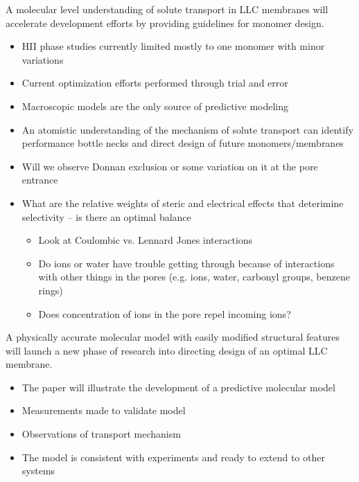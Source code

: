 \documentclass{article}
\begin{document}
	A molecular level understanding of solute transport in LLC membranes will accelerate development efforts by providing guidelines for monomer design.
	\begin{itemize}
		\item HII phase studies currently limited mostly to one monomer with minor variations
		\item Current optimization efforts performed through trial and error
		\item Macroscopic models are the only source of predictive modeling
		\item An atomistic understanding of the mechanism of solute transport can identify
		performance bottle necks and direct design of future monomers/membranes
		\item Will we observe Donnan exclusion or some variation on it at the pore entrance
		\item What are the relative weights of steric and electrical effects that deterimine selectivity -- is there an optimal balance
		\begin{itemize}
			\item Look at Coulombic vs. Lennard Jones interactions
			\item Do ions or water have trouble getting through because of interactions with other things in the pores (e.g. ions, water, carbonyl groups, benzene rings)
			\item Does concentration of ions in the pore repel incoming ions?
		\end{itemize}
	\end{itemize}
	
	A physically accurate molecular model with easily modified structural features will launch a new phase of research into directing design of an optimal LLC membrane.
	\begin{itemize}
		\item The paper will illustrate the development of a predictive molecular model
		\item Measurements made to validate model
		\item Observations of transport mechanism
		\item The model is consistent with experiments and ready to extend to other systems
	\end{itemize}
	
\end{document}

